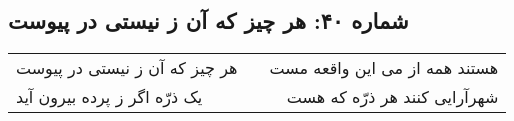 \begin{center}
\section*{شماره ۴۰: هر چیز که آن ز نیستی در پیوست}
\label{sec:040}
\begin{longtable}{l p{0.5cm} r}
هر چیز که آن ز نیستی در پیوست
&&
هستند همه از می این واقعه مست
\\
یک ذرّه اگر ز پرده بیرون آید
&&
شهرآرایی کنند هر ذرّه که هست
\\
\end{longtable}
\end{center}
